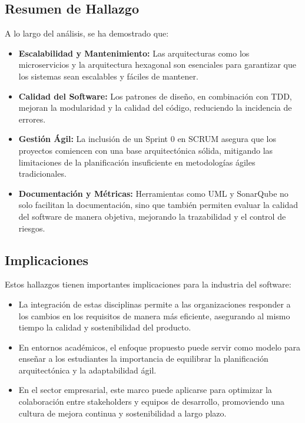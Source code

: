 \documentclass[conference]{IEEEtran}
\begin{document}
\subsection{Resumen de Hallazgo}
A lo largo del análisis, se ha demostrado que:
\begin{itemize}
    \item \textbf{Escalabilidad y Mantenimiento:} Las arquitecturas como los microservicios y la arquitectura hexagonal son esenciales para garantizar que los sistemas sean escalables y fáciles de mantener.
    \item \textbf{Calidad del Software:} Los patrones de diseño, en combinación con TDD, mejoran la modularidad y la calidad del código, reduciendo la incidencia de errores.
    \item \textbf{Gestión Ágil:} La inclusión de un Sprint 0 en SCRUM asegura que los proyectos comiencen con una base arquitectónica sólida, mitigando las limitaciones de la planificación insuficiente en metodologías ágiles tradicionales.
    \item \textbf{Documentación y Métricas:} Herramientas como UML y SonarQube no solo facilitan la documentación, sino que también permiten evaluar la calidad del software de manera objetiva, mejorando la trazabilidad y el control de riesgos.\\
\end{itemize}

\subsection{Implicaciones}
Estos hallazgos tienen importantes implicaciones para la industria del software:
\begin{itemize}
    \item La integración de estas disciplinas permite a las organizaciones responder a los cambios en los requisitos de manera más eficiente, asegurando al mismo tiempo la calidad y sostenibilidad del producto.
    \item En entornos académicos, el enfoque propuesto puede servir como modelo para enseñar a los estudiantes la importancia de equilibrar la planificación arquitectónica y la adaptabilidad ágil.
    \item En el sector empresarial, este marco puede aplicarse para optimizar la colaboración entre stakeholders y equipos de desarrollo, promoviendo una cultura de mejora continua y sostenibilidad a largo plazo.
\end{itemize}
\end{document}
